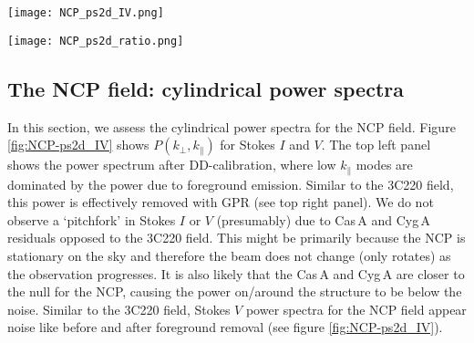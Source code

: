 \documentclass[fleqn,usenatbib]{mnras}
\begin{document}
\begin{figure*}
\centering
\texttt{[image: NCP\_ps2d\_IV.png]}
    \caption{The cylindrically averaged Stokes $I$ and $V$ power spectra for the NCP field. The top row shows $P_{I}(k_{\perp},k_{\parallel})$ before (left panel) and after (right panel) foreground removal with GPR. The bottom row shows $P_{V}(k_{\perp},k_{\parallel})$ before (left panel) and after (right panel) foreground removal with GPR.} 
\label{fig:NCP-ps2d_IV}
\end{figure*} 

\begin{figure*}
\centering
\texttt{[image: NCP\_ps2d\_ratio.png]}
    \caption{The ratio of the cylindrically averaged Stokes $I$ and $V$ power spectra for the NCP field. The left panel shows $P_{I}/P_{V}$ before foreground removal with GPR. The right panel shows $P_{I}/P_{V}$ after foreground removal with GPR.} 
\label{fig:NCP-ps2d_ratio}
\end{figure*} 

\subsection{The NCP field: cylindrical power spectra}\label{sec:PSpec_NCP}
In this section, we assess the cylindrical power spectra for the NCP field. Figure \ref{fig:NCP-ps2d_IV} shows $P(k_{\perp},k_{\parallel})$ for Stokes $I$ and $V$. The top left panel shows the power spectrum after DD-calibration, where low $k_{\parallel}$ modes are dominated by the power due to foreground emission. Similar to the 3C220 field, this power is effectively removed with GPR (see top right panel). We do not observe a `pitchfork' in Stokes $I$ or $V$ (presumably) due to Cas\,A and Cyg\,A residuals opposed to the 3C220 field. This might be primarily because the NCP is stationary on the sky and therefore the beam does not change (only rotates) as the observation progresses. It is also likely that the Cas\,A and Cyg\,A are closer to the null for the NCP, causing the power on/around the structure to be below the noise. Similar to the 3C220 field, Stokes $V$ power spectra for the NCP field appear noise like before and after foreground removal (see figure \ref{fig:NCP-ps2d_IV}). %
\end{document}
